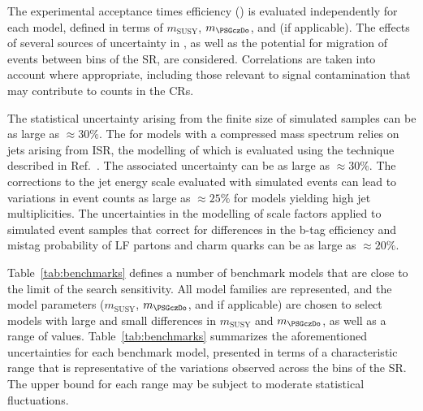 The experimental acceptance times efficiency (\ate) is evaluated
independently for each model, defined in terms of $m_\text{SUSY}$,
$m_{\PSGczDo}$, and \ctau (if applicable). The effects of several
sources of uncertainty in \ate, as well as the potential for migration
of events between bins of the SR, are considered. Correlations are
taken into account where appropriate, including those relevant to
signal contamination that may contribute to counts in the CRs.

The statistical uncertainty arising from the finite size of simulated
samples can be as large as ${\approx}30\%$. The \ate for models with a
compressed mass spectrum relies on jets arising from ISR, the
modelling of which is evaluated using the technique described in
Ref.~\cite{Chatrchyan:2013xna}. The associated uncertainty can be as
large as ${\approx}30\%$. The corrections to the jet energy scale
evaluated with simulated events can lead to variations in event counts
as large as ${\approx}25\%$ for models yielding high jet
multiplicities. The uncertainties in the modelling of scale factors
applied to simulated event samples that correct for differences in the
b-tag efficiency and mistag probability of LF partons and charm quarks
can be as large as ${\approx}20\%$.

Table~\ref{tab:benchmarks} defines a number of benchmark models that
are close to the limit of the search sensitivity. All model families
are represented, and the model parameters ($m_\text{SUSY}$,
$m_{\PSGczDo}$, and \ctau if applicable) are chosen to select models
with large and small differences in $m_\text{SUSY}$ and
$m_{\PSGczDo}$, as well as a range of \ctau
values. Table~\ref{tab:benchmarks} summarizes the aforementioned
uncertainties for each benchmark model, presented in terms of a
characteristic range that is representative of the variations observed
across the bins of the SR. The upper bound for each range may be
subject to moderate statistical fluctuations.

